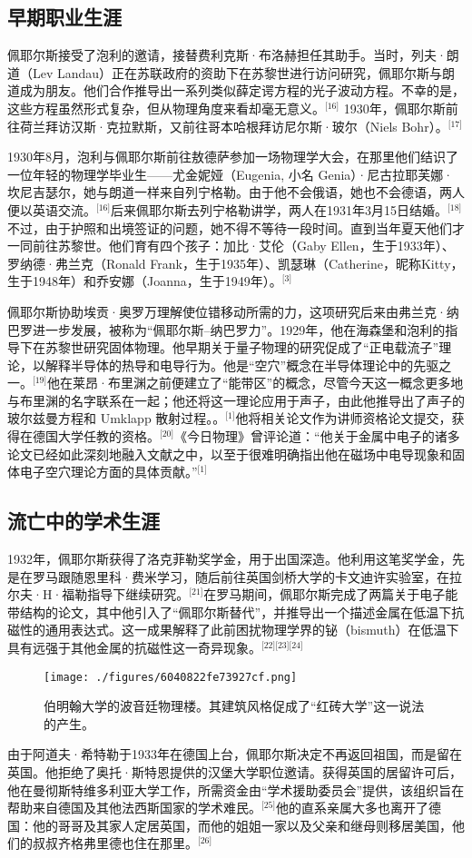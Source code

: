 \subsection{早期职业生涯}
佩耶尔斯接受了泡利的邀请，接替费利克斯·布洛赫担任其助手。当时，列夫·朗道（Lev Landau）正在苏联政府的资助下在苏黎世进行访问研究，佩耶尔斯与朗道成为朋友。他们合作推导出一系列类似薛定谔方程的光子波动方程。不幸的是，这些方程虽然形式复杂，但从物理角度来看却毫无意义。\(^\text{[16]}\)
1930年，佩耶尔斯前往荷兰拜访汉斯·克拉默斯，又前往哥本哈根拜访尼尔斯·玻尔（Niels Bohr）。\(^\text{[17]}\)

1930年8月，泡利与佩耶尔斯前往敖德萨参加一场物理学大会，在那里他们结识了一位年轻的物理学毕业生——尤金妮娅（Eugenia, 小名 Genia）·尼古拉耶芙娜·坎尼吉瑟尔，她与朗道一样来自列宁格勒。由于他不会俄语，她也不会德语，两人便以英语交流。\(^\text{[16]}\)后来佩耶尔斯去列宁格勒讲学，两人在1931年3月15日结婚。\(^\text{[18]}\)不过，由于护照和出境签证的问题，她不得不等待一段时间。直到当年夏天他们才一同前往苏黎世。他们育有四个孩子：加比·艾伦（Gaby Ellen，生于1933年）、罗纳德·弗兰克（Ronald Frank，生于1935年）、凯瑟琳（Catherine，昵称Kitty，生于1948年）和乔安娜（Joanna，生于1949年）。\(^\text{[3]}\)

佩耶尔斯协助埃贡·奥罗万理解使位错移动所需的力，这项研究后来由弗兰克·纳巴罗进一步发展，被称为“佩耶尔斯–纳巴罗力”。1929年，他在海森堡和泡利的指导下在苏黎世研究固体物理。他早期关于量子物理的研究促成了“正电载流子”理论，以解释半导体的热导和电导行为。他是“空穴”概念在半导体理论中的先驱之一。\(^\text{[19]}\)他在莱昂·布里渊之前便建立了“能带区”的概念，尽管今天这一概念更多地与布里渊的名字联系在一起；他还将这一理论应用于声子，由此他推导出了声子的玻尔兹曼方程和 Umklapp 散射过程。。\(^\text{[1]}\)他将相关论文作为讲师资格论文提交，获得在德国大学任教的资格。\(^\text{[20]}\)《今日物理》曾评论道：“他关于金属中电子的诸多论文已经如此深刻地融入文献之中，以至于很难明确指出他在磁场中电导现象和固体电子空穴理论方面的具体贡献。”\(^\text{[1]}\)
\subsection{流亡中的学术生涯}
1932年，佩耶尔斯获得了洛克菲勒奖学金，用于出国深造。他利用这笔奖学金，先是在罗马跟随恩里科·费米学习，随后前往英国剑桥大学的卡文迪许实验室，在拉尔夫·H·福勒指导下继续研究。\(^\text{[21]}\)在罗马期间，佩耶尔斯完成了两篇关于电子能带结构的论文，其中他引入了“佩耶尔斯替代”，并推导出一个描述金属在低温下抗磁性的通用表达式。这一成果解释了此前困扰物理学界的铋（bismuth）在低温下具有远强于其他金属的抗磁性这一奇异现象。\(^\text{[22][23][24]}\)
\begin{figure}[ht]
\centering
\texttt{[image: ./figures/6040822fe73927cf.png]}
\caption{伯明翰大学的波音廷物理楼。其建筑风格促成了“红砖大学”这一说法的产生。} \label{fig_LDF_2}
\end{figure}
由于阿道夫·希特勒于1933年在德国上台，佩耶尔斯决定不再返回祖国，而是留在英国。他拒绝了奥托·斯特恩提供的汉堡大学职位邀请。获得英国的居留许可后，他在曼彻斯特维多利亚大学工作，所需资金由“学术援助委员会”提供，该组织旨在帮助来自德国及其他法西斯国家的学术难民。\(^\text{[25]}\)他的直系亲属大多也离开了德国：他的哥哥及其家人定居英国，而他的姐姐一家以及父亲和继母则移居美国，他们的叔叔齐格弗里德也住在那里。\(^\text{[26]}\)

